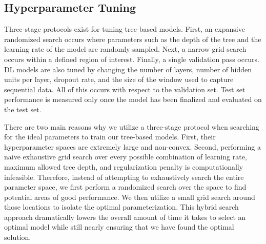 \subsection{Hyperparameter Tuning}

Three-stage protocols exist for tuning tree-based models. First, an expansive randomized search occurs where parameters such as the depth of the tree and the learning rate of the model are randomly sampled. Next, a narrow grid search occurs within a defined region of interest. Finally, a single validation pass occurs. DL models are also tuned by changing the number of layers, number of hidden units per layer, dropout rate, and the size of the window used to capture sequential data. All of this occurs with respect to the validation set. Test set performance is measured only once the model has been finalized and evaluated on the test set.

There are two main reasons why we utilize a three-stage protocol when searching for the ideal parameters to train our tree-based models. First, their hyperparameter spaces are extremely large and non-convex. Second, performing a naive exhaustive grid search over every possible combination of learning rate, maximum allowed tree depth, and regularization penalty is computationally infeasible. Therefore, instead of attempting to exhaustively search the entire parameter space, we first perform a randomized search over the space to find potential areas of good performance. We then utilize a small grid search around those locations to isolate the optimal parameterization. This hybrid search approach dramatically lowers the overall amount of time it takes to select an optimal model while still nearly ensuring that we have found the optimal solution.

